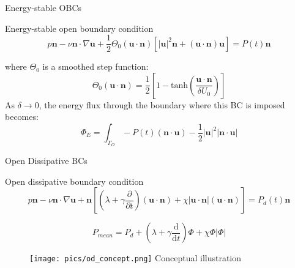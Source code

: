 \documentclass{beamer}
\begin{document}
\begin{frame}{Energy-stable OBCs}

	\begin{block}{Energy-stable open boundary condition}
		\begin{equation}
			p\mathbf{n}-\nu\mathbf{n}\cdot\nabla\mathbf{u}+\frac{1}{2}\Theta_{0}\left(\mathbf{u}\cdot\mathbf{n}\right)\left[\left|\mathbf{u}\right|^{2}\mathbf{n}+\left(\mathbf{u}\cdot\mathbf{n}\right)\mathbf{u}\right]=P\left(t\right)\mathbf{n}
		\end{equation}
	\end{block}
	where $\Theta_{0}$ is a smoothed step function:
	\begin{equation*}
		\Theta_{0}\left(\mathbf{u}\cdot\mathbf{n}\right)=\frac{1}{2}\left[1-\mathrm{tanh}\left(\frac{\mathbf{u}\cdot\mathbf{n}}{\delta U_{0}}\right)\right]
	\end{equation*}
	As $\delta\rightarrow 0$, the energy flux through the boundary where this BC is imposed becomes:
	\begin{equation}
			\Phi_{E}= \int_{\Gamma_{O}} - P \left( t \right) \left( \mathbf{n} \cdot \mathbf{u} \right) - \frac{1}{2} \left|\mathbf{u}\right|^{2} \left| \mathbf{n} \cdot \mathbf{u} \right|
	\end{equation}

\end{frame}

\begin{frame}{Open Dissipative BCs}

	\begin{block}{Open dissipative boundary condition}
		\begin{equation}
			p\mathbf{n}-\nu\mathbf{n}\cdot\nabla\mathbf{u}+\mathbf{n}\left[\left(\lambda+\gamma\frac{\partial}{\partial t}\right)\left(\mathbf{u}\cdot\mathbf{n}\right)+\chi\left|\mathbf{u}\cdot\mathbf{n}\right|\left(\mathbf{u}\cdot\mathbf{n}\right)\right]=P_{d}\left(t\right)\mathbf{n}
		\end{equation}
	\end{block}
	\begin{equation}
		P_{mean}=P_{d}+\left(\lambda+\gamma\frac{\mathrm{d}}{\mathrm{d}t}\right)\Phi+\chi\Phi\left|\Phi\right|
	\end{equation}
	\begin{figure}
		\texttt{[image: pics/od\_concept.png]}
		Conceptual illustration
	\end{figure}

\end{frame}
\end{document}
